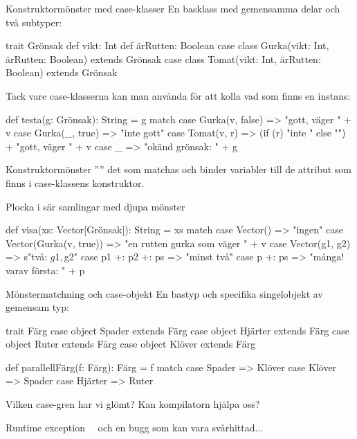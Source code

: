 \begin{Slide}{Konstruktormönster med case-klasser}\SlideFontSmall
En basklass med gemensamma delar och två subtyper:
\begin{Code}
trait Grönsak {
  def vikt: Int
  def ärRutten: Boolean
}
case class Gurka(vikt: Int, ärRutten: Boolean) extends Grönsak
case class Tomat(vikt: Int, ärRutten: Boolean) extends Grönsak
\end{Code}
\pause
Tack vare case-klasserna kan man använda   för att kolla vad som finns  en instans:
\begin{Code}
def testa(g: Grönsak): String = g match {
  case Gurka(v, false) => "gott, väger " + v
  case Gurka(_, true)  => "inte gott"
  case Tomat(v, r)     => (if (r) "inte " else "") + "gott, väger " + v 
  case _ => "okänd grönsak: " + g
}
\end{Code}

Konstruktormönster '''' det som matchas och binder variabler till de attribut som finns i case-klassens konstruktor.
\end{Slide}


\begin{Slide}{Plocka i sär samlingar med djupa mönster}
\begin{Code}
def visa(xs: Vector[Grönsak]): String = xs match {
  case Vector()               => "ingen"
  case Vector(Gurka(v, true)) => "en rutten gurka som väger " + v
  case Vector(g1, g2)         => s"två: $g1, $g2"
  case p1 +: p2 +: ps         => "minst två"
  case p +: ps                => "många! varav första: " + p 
}
\end{Code}
\end{Slide}

\begin{Slide}{Mönstermatchning och case-objekt}
En bastyp och specifika singelobjekt av gemensam typ:
\begin{Code}
trait Färg
case object Spader  extends Färg
case object Hjärter extends Färg
case object Ruter   extends Färg
case object Klöver  extends Färg

def parallellFärg(f: Färg): Färg = f match {
  case Spader  => Klöver
  case Klöver  => Spader
  case Hjärter => Ruter
}
\end{Code}
Vilken case-gren har vi glömt? Kan kompilatorn hjälpa oss?
\pause
{}
Runtime exception \code{:(} ~~och en bugg som kan vara svårhittad...
\end{Slide}

